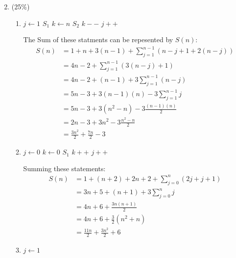 \documentclass[11pt]{article}
\begin{document}
\begin{enumerate}
\setcounter{enumi}{1}

\item (25\%)
\begin{enumerate}
\item 

\begin{algorithmic}
\State $j \gets 1 $ 
 
    \State $S_1$  
	\State $k \gets n$ 
	 
		\State $S_2$ 
		\State $k--$ 
	\EndWhile
	\State $j++$ 
\EndWhile
\end{algorithmic}

The Sum of these statments can be repesented by $S(n)$:
\begin{align*}
S(n) &= 1 + n + 3(n-1) + \sum_{j=1}^{n-1} (n-j+1+2(n-j))
\\&= 4n-2 + \sum_{j=1}^{n-1}(3(n-j)+1)
\\&= 4n-2 + (n-1)+3\sum_{j=1}^{n-1}(n-j) 
\\&= 5n-3 + 3(n-1)(n)- 3\sum_{j=1}^{n-1}j
\\&= 5n-3 + 3(n^2-n) - 3\frac{(n-1)(n)}{2}
\\&= 2n -3 + 3n^2 -3\frac{n^2-n}{2}
\\&= \frac{3n^2}{2}+ \frac{7n}{2}-3
\end{align*}
\item 
\begin{algorithmic}
\State $j \gets 0$ 
 
	\State $k \gets 0$ 
	 
		\State $S_1$ 
		\State $k++$ 
	\EndWhile
	\State $j++$ 
\EndWhile
\end{algorithmic}
Summing these statements:
\begin{align*}
S(n) &= 1 + (n+2) + 2n+2 + \sum_{j=0}^n (2j+j+1)
\\&= 3n+5 + (n+1) + 3 \sum_{j=0}^n j
\\&= 4n+6 + \frac{3n(n+1)}{2}
\\&= 4n + 6 + \frac{3}{2} (n^2+n)
\\&= \frac{11n}{2} + \frac{3n^2}{2} + 6
\end{align*}
\newpage
\item
\begin{algorithmic}
\State $j \gets 1$ 

\end{algorithmic}
\end{enumerate}
\end{enumerate}
\end{document}
